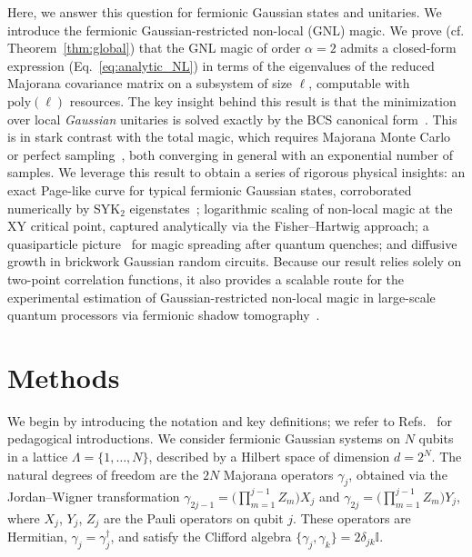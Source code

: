 \documentclass[prx,twocolumn,superscriptaddress,aps,10pt, frontmatterverbose, reprint,footinbib,longbibliography=true]{revtex4-2}
\newcommand{\RENYI}{\alpha}
\providecommand{\DIFaddtex}[1]{{\protect\color{red}\uwave{#1}}} %
\providecommand{\DIFaddbegin}{\protect\color{red}} %
\providecommand{\DIFaddend}{\protect\color{black}} %
\providecommand{\DIFadd}[1]{\texorpdfstring{\DIFaddtex{#1}}{#1}} %
\newcommand{\DIFaddincludegraphics}[2][]{{\color{blue}\fbox{\DIFOincludegraphics[#1]{#2}}}} %
\DeclareRobustCommand{\DIFaddbegin}{\DIFOaddbegin \let\includegraphics\DIFaddincludegraphics} %
\DeclareRobustCommand{\DIFaddend}{\DIFOaddend \let\includegraphics\DIFOincludegraphics} %
\begin{document}
Here, we answer this question for fermionic Gaussian states and unitaries. We introduce the fermionic Gaussian-restricted non-local (GNL) magic.
We prove (cf. Theorem~\ref{thm:global}) that the GNL magic of order $\RENYI=2$ admits a closed-form expression (Eq.~\eqref{eq:analytic_NL}) in terms of the eigenvalues of the reduced Majorana covariance matrix on a \DIFaddbegin \DIFadd{contiguous }\DIFaddend subsystem of size $\ell$, computable with $\mathrm{poly}(\ell)$ resources. 
The key insight behind this result is that the minimization over local \emph{Gaussian} unitaries is solved exactly by the BCS canonical form~\cite{BoteroReznik2004}. 
This is in stark contrast with the total magic, which requires Majorana Monte Carlo~\cite{Bera_2025} or perfect sampling~\cite{collura2026nonstabilizernessfermionicgaussianstates}, both converging in general with an exponential number of samples.
We leverage this result to obtain a series of rigorous physical insights: an exact Page-like curve for typical fermionic Gaussian states, corroborated numerically by SYK$_2$ eigenstates~\cite{Bera_2025,santra2025complexitytransitionschaoticquantum,jasser2025stabilizer, malvimat2026multipartitenonlocalmagicsyk, njgn-fksh}; logarithmic scaling of non-local magic at the XY critical point, captured analytically via the Fisher--Hartwig approach; a quasiparticle picture~\cite{calabrese2009} for magic spreading after quantum quenches; and diffusive growth in brickwork Gaussian random circuits.
Because our result relies solely on two-point correlation functions, it also provides a scalable route for the experimental estimation of Gaussian-restricted non-local magic in large-scale quantum processors via fermionic shadow tomography~\cite{Wan_2023}.

\section{Methods}
\label{sec:methods}
We begin by introducing the notation and key definitions; we refer to Refs.~\cite{Mbeng2024,surace,sierant2026fermionic,sierant2026theorymatchgatecommutant} for pedagogical introductions.
We consider fermionic Gaussian systems on $N$ qubits in a lattice $\Lambda=\{1,\dots, N\}$, described by a Hilbert space of dimension $d=2^N$.
The natural degrees of freedom are the $2N$ Majorana operators $\gamma_j$, obtained via the Jordan--Wigner transformation $\gamma_{2j-1} = \bigl(\prod_{m=1}^{j-1} Z_m\bigr)X_j$ and $\gamma_{2j} = \bigl(\prod_{m=1}^{j-1} Z_m\bigr)Y_j$, where $X_j$, $Y_j$, $Z_j$ are the Pauli operators on qubit $j$.
These operators are Hermitian, $\gamma_j=\gamma_j^\dagger$, and satisfy the Clifford algebra $\lbrace \gamma_j,\gamma_k\}=2 \delta_{jk} \mathbb{I}$.
\end{document}
